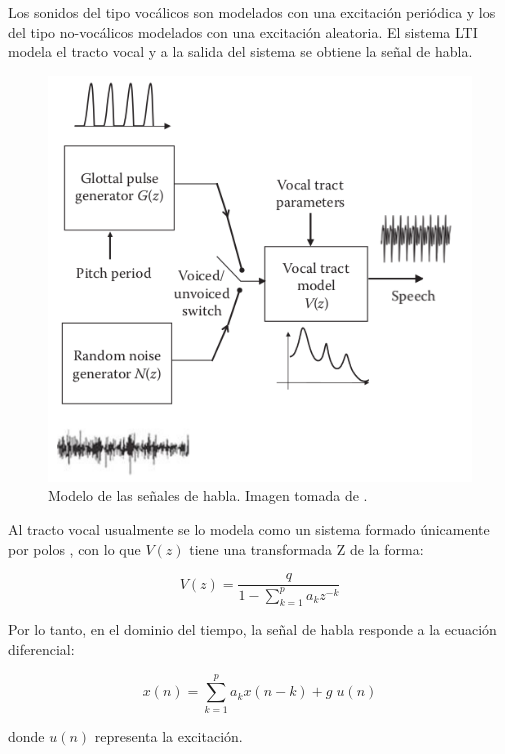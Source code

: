 Los sonidos del tipo vocálicos son modelados con una excitación periódica y los del tipo no-vocálicos modelados con una excitación aleatoria. El sistema LTI modela el tracto vocal y a la salida del sistema se obtiene la señal de habla.

\begin{figure}
	\centering
	\centerline{\includegraphics[scale=0.5]{images/ch3/voice-modeling.png}}
	\caption{Modelo de las señales de habla. Imagen tomada de \cite{speech_enhancement_theory_and_practice}.}
	\label{fig:ch3_voice_modeling}
\end{figure}


Al tracto vocal usualmente se lo modela como un sistema formado únicamente por polos \cite{spoken_language_processing}, con lo que $V(z)$ tiene una transformada Z de la forma:

\begin{equation*}
	V(z) = \frac{q}{1 - \sum_{k=1}^{p} a_k z^{-k}}
\end{equation*}

Por lo tanto, en el dominio del tiempo, la señal de habla responde a la ecuación diferencial:

\begin{equation*}
	x(n) = \sum_{k=1}^{p}a_k x(n-k) + g \; u(n)
\end{equation*}

\noindent donde $u(n)$ representa la excitación.

